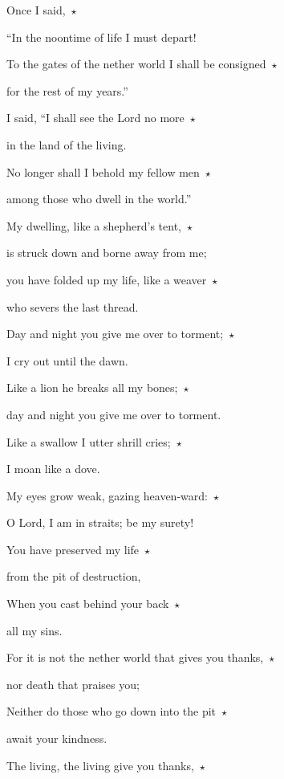 \noindent Once I said,~$\star$~\nopagebreak

“In the noontime of life I must depart!

\noindent To the gates of the nether world I shall be consigned~$\star$~\nopagebreak

for the rest of my years.”

\noindent I said, “I shall see the Lord no more~$\star$~\nopagebreak

in the land of the living.

\noindent No longer shall I behold my fellow men~$\star$~\nopagebreak

among those who dwell in the world.”

\noindent My dwelling, like a shepherd’s tent,~$\star$~\nopagebreak

is struck down and borne away from me;

\noindent you have folded up my life, like a weaver~$\star$~\nopagebreak

who severs the last thread.

\noindent Day and night you give me over to torment;~$\star$~\nopagebreak

I cry out until the dawn.

\noindent Like a lion he breaks all my bones;~$\star$~\nopagebreak

day and night you give me over to torment.

\noindent Like a swallow I utter shrill cries;~$\star$~\nopagebreak

I moan like a dove.

\noindent My eyes grow weak, gazing heaven-ward:~$\star$~\nopagebreak

O Lord, I am in straits; be my surety!

\noindent You have preserved my life~$\star$~\nopagebreak

from the pit of destruction,

\noindent When you cast behind your back~$\star$~\nopagebreak

all my sins.

\noindent For it is not the nether world that gives you thanks,~$\star$~\nopagebreak

nor death that praises you;

\noindent Neither do those who go down into the pit~$\star$~\nopagebreak

await your kindness.

\noindent The living, the living give you thanks,~$\star$~\nopagebreak

